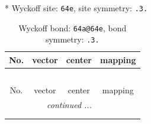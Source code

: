\documentclass[fleqn,8pt]{jsarticle}
\begin{document}
* Wyckoff site: {\tt 64e}, site symmetry: {\tt .3.}
\renewcommand{\arraystretch}{1.2}
\begin{longtable}{cccc}
\caption{Wyckoff bond: {\tt 64a@64e}, bond symmetry: {\tt .3.}}
 \\
 \hline \hline
No. & vector & center & mapping \\ \hline \endfirsthead

\multicolumn{3}{l}{\tablename\ \thetable{}} \\
 \hline \hline
No. & vector & center & mapping \\ \hline \endhead

 \hline \hline
\multicolumn{3}{r}{\footnotesize\it continued ...} \\ \endfoot

 \hline \hline
\multicolumn{3}{r}{} \\ \endlastfoot


\end{longtable}
\end{document}

